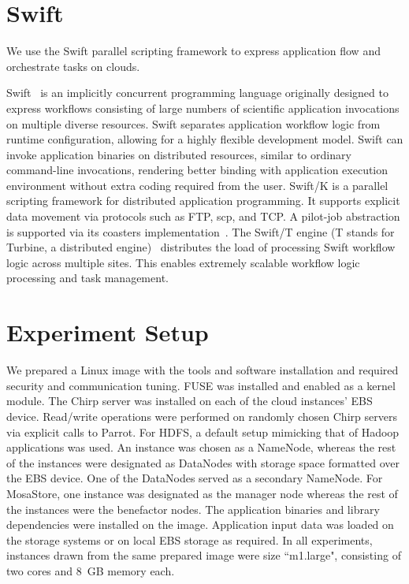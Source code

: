 \documentclass[10pt,journal,cspaper,compsoc]{IEEEtran}
\begin{document}
\section{Swift}\label{sec:swift}
We use the Swift parallel scripting framework to express application flow and
orchestrate tasks on clouds. 

Swift~\cite{Swift_2011} is an implicitly concurrent programming language
originally designed to express workflows consisting of large numbers of
scientific application invocations on multiple diverse resources. Swift
separates application workflow logic from runtime configuration, allowing for a
highly flexible development model. Swift can invoke application binaries on
distributed resources, similar to ordinary command-line invocations, rendering
better binding with application execution environment without extra coding
required from the user. Swift/K is a parallel scripting framework for
distributed application programming. It supports explicit data movement via
protocols such as FTP, scp, and TCP. A pilot-job abstraction is supported via
its coasters implementation~\cite{Coasters_UCC_2011}. The Swift/T engine (T
stands for Turbine, a distributed engine)~\cite{fi:2013} distributes the load
of processing Swift workflow logic across multiple sites. This enables
extremely scalable workflow logic processing and task management. 

\section{Experiment Setup}\label{sec:expsetup}
We prepared a Linux image with the tools and software installation and required
security and communication tuning. FUSE was installed and enabled as a kernel
module.  The Chirp server was installed on each of the cloud instances' EBS
device.  Read/write operations were performed on randomly chosen Chirp servers
via explicit calls to Parrot. For HDFS, a default setup mimicking that of
Hadoop applications was used. An instance was chosen as a NameNode, whereas the
rest of the instances were designated as DataNodes with storage space formatted
over the EBS device. One of the DataNodes served as a secondary NameNode. For
MosaStore, one instance was designated as the manager node whereas the rest of
the instances were the benefactor nodes. The application binaries and library
dependencies were installed on the image.  Application input data was loaded on
the storage systems or on local EBS storage as required. In all experiments,
instances drawn from the same prepared image were size ``m1.large", consisting
of two cores and 8~GB memory each.
\end{document}
